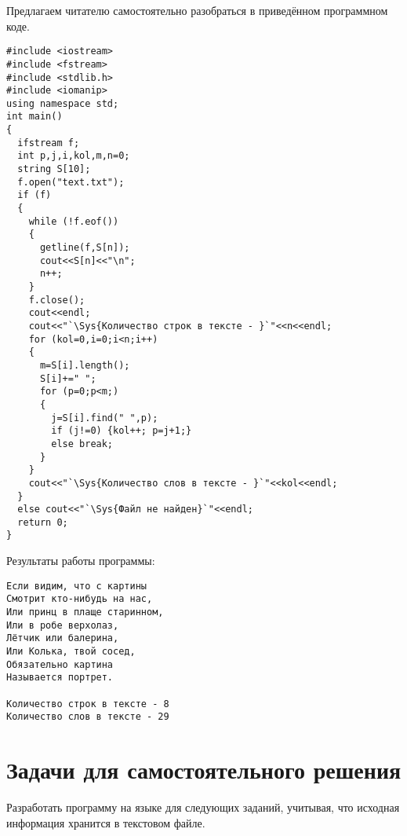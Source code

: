 
Предлагаем читателю самостоятельно разобраться в приведённом программном коде. 
\begin{lstlisting}
#include <iostream>
#include <fstream>
#include <stdlib.h>
#include <iomanip>
using namespace std;
int main()
{
  ifstream f;
  int p,j,i,kol,m,n=0;
  string S[10];
  f.open("text.txt");
  if (f)
  {
    while (!f.eof())
    {
      getline(f,S[n]);
      cout<<S[n]<<"\n";
      n++;
    }
    f.close();
    cout<<endl;
    cout<<"`\Sys{Количество строк в тексте - }`"<<n<<endl;
    for (kol=0,i=0;i<n;i++)
    {
      m=S[i].length();
      S[i]+=" ";
      for (p=0;p<m;)
      {
        j=S[i].find(" ",p);
        if (j!=0) {kol++; p=j+1;}
        else break;
      }
    }
    cout<<"`\Sys{Количество слов в тексте - }`"<<kol<<endl;
  }
  else cout<<"`\Sys{Файл не найден}`"<<endl;
  return 0;
}
\end{lstlisting}
Результаты работы программы:
\begin{verbatim}
Если видим, что с картины
Смотрит кто-нибудь на нас,
Или принц в плаще старинном,
Или в робе верхолаз,
Лётчик или балерина,
Или Колька, твой сосед,
Обязательно картина
Называется портрет.

Количество строк в тексте - 8
Количество слов в тексте - 29
\end{verbatim}

\section[Задачи для самостоятельного решения]{Задачи для самостоятельного решения}
Разработать программу на языке  для следующих заданий, учитывая, что исходная информация хранится в текстовом файле.

